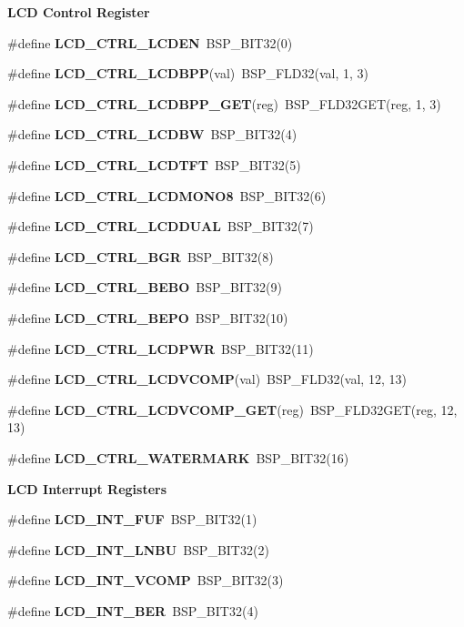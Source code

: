 \begin{Indent}\textbf{ L\+CD Control Register}\par
\begin{DoxyCompactItemize}
\item 
\#define {\bfseries L\+C\+D\+\_\+\+C\+T\+R\+L\+\_\+\+L\+C\+D\+EN}~B\+S\+P\+\_\+\+B\+I\+T32(0)
\item 
\#define {\bfseries L\+C\+D\+\_\+\+C\+T\+R\+L\+\_\+\+L\+C\+D\+B\+PP}(val)~B\+S\+P\+\_\+\+F\+L\+D32(val, 1, 3)
\item 
\#define {\bfseries L\+C\+D\+\_\+\+C\+T\+R\+L\+\_\+\+L\+C\+D\+B\+P\+P\+\_\+\+G\+ET}(reg)~B\+S\+P\+\_\+\+F\+L\+D32\+G\+ET(reg, 1, 3)
\item 
\#define {\bfseries L\+C\+D\+\_\+\+C\+T\+R\+L\+\_\+\+L\+C\+D\+BW}~B\+S\+P\+\_\+\+B\+I\+T32(4)
\item 
\#define {\bfseries L\+C\+D\+\_\+\+C\+T\+R\+L\+\_\+\+L\+C\+D\+T\+FT}~B\+S\+P\+\_\+\+B\+I\+T32(5)
\item 
\#define {\bfseries L\+C\+D\+\_\+\+C\+T\+R\+L\+\_\+\+L\+C\+D\+M\+O\+N\+O8}~B\+S\+P\+\_\+\+B\+I\+T32(6)
\item 
\#define {\bfseries L\+C\+D\+\_\+\+C\+T\+R\+L\+\_\+\+L\+C\+D\+D\+U\+AL}~B\+S\+P\+\_\+\+B\+I\+T32(7)
\item 
\#define {\bfseries L\+C\+D\+\_\+\+C\+T\+R\+L\+\_\+\+B\+GR}~B\+S\+P\+\_\+\+B\+I\+T32(8)
\item 
\#define {\bfseries L\+C\+D\+\_\+\+C\+T\+R\+L\+\_\+\+B\+E\+BO}~B\+S\+P\+\_\+\+B\+I\+T32(9)
\item 
\#define {\bfseries L\+C\+D\+\_\+\+C\+T\+R\+L\+\_\+\+B\+E\+PO}~B\+S\+P\+\_\+\+B\+I\+T32(10)
\item 
\#define {\bfseries L\+C\+D\+\_\+\+C\+T\+R\+L\+\_\+\+L\+C\+D\+P\+WR}~B\+S\+P\+\_\+\+B\+I\+T32(11)
\item 
\#define {\bfseries L\+C\+D\+\_\+\+C\+T\+R\+L\+\_\+\+L\+C\+D\+V\+C\+O\+MP}(val)~B\+S\+P\+\_\+\+F\+L\+D32(val, 12, 13)
\item 
\#define {\bfseries L\+C\+D\+\_\+\+C\+T\+R\+L\+\_\+\+L\+C\+D\+V\+C\+O\+M\+P\+\_\+\+G\+ET}(reg)~B\+S\+P\+\_\+\+F\+L\+D32\+G\+ET(reg, 12, 13)
\item 
\#define {\bfseries L\+C\+D\+\_\+\+C\+T\+R\+L\+\_\+\+W\+A\+T\+E\+R\+M\+A\+RK}~B\+S\+P\+\_\+\+B\+I\+T32(16)
\end{DoxyCompactItemize}
\end{Indent}
\begin{Indent}\textbf{ L\+CD Interrupt Registers}\par
\begin{DoxyCompactItemize}
\item 
\#define {\bfseries L\+C\+D\+\_\+\+I\+N\+T\+\_\+\+F\+UF}~B\+S\+P\+\_\+\+B\+I\+T32(1)
\item 
\#define {\bfseries L\+C\+D\+\_\+\+I\+N\+T\+\_\+\+L\+N\+BU}~B\+S\+P\+\_\+\+B\+I\+T32(2)
\item 
\#define {\bfseries L\+C\+D\+\_\+\+I\+N\+T\+\_\+\+V\+C\+O\+MP}~B\+S\+P\+\_\+\+B\+I\+T32(3)
\item 
\#define {\bfseries L\+C\+D\+\_\+\+I\+N\+T\+\_\+\+B\+ER}~B\+S\+P\+\_\+\+B\+I\+T32(4)
\end{DoxyCompactItemize}
\end{Indent}

